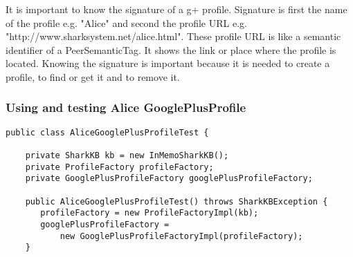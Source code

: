 \documentclass[12pt]{article}
\begin{document}
It is important to know the signature of a g+ profile. Signature is first the name of the profile e.g. "Alice" and second the profile URL e.g. "http://www.sharksystem.net/alice.html". These profile URL is like a semantic identifier of a PeerSemanticTag. It shows the link or place where the profile is located. Knowing the signature is important because it is needed to create a profile, to find or get it and to remove it.



\subsubsection{Using and testing Alice GooglePlusProfile}

\begin{verbatim}
public class AliceGooglePlusProfileTest {

    private SharkKB kb = new InMemoSharkKB();
    private ProfileFactory profileFactory;
    private GooglePlusProfileFactory googlePlusProfileFactory;

    public AliceGooglePlusProfileTest() throws SharkKBException {
       profileFactory = new ProfileFactoryImpl(kb);
       googlePlusProfileFactory =
           new GooglePlusProfileFactoryImpl(profileFactory);
    }


\end{verbatim}
\end{document}
